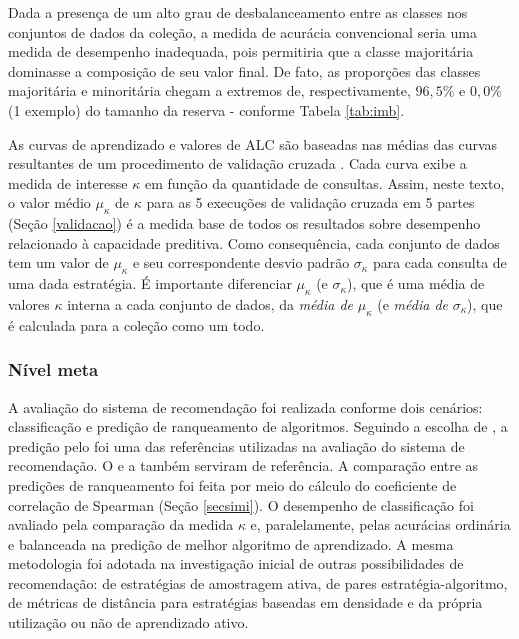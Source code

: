 Dada a presença de um alto grau de desbalanceamento entre as classes nos conjuntos de dados da coleção, a medida de acurácia convencional seria uma medida de desempenho inadequada, pois permitiria que a classe majoritária dominasse a composição de seu valor final.
De fato, as proporções das classes majoritária e minoritária chegam a extremos de, respectivamente, $96,5\%$ e $0,0\%$ (1 exemplo) do tamanho da reserva - conforme Tabela \ref{tab:imb}.

As curvas de aprendizado e valores de ALC são baseadas nas médias das curvas resultantes de um procedimento de validação cruzada \cite{settles2010active}.
Cada curva exibe a medida de interesse $\kappa$ em função da quantidade de consultas.
Assim, neste texto,  o valor médio $\mu_{\kappa}$ de $\kappa$ para as 5 execuções de validação cruzada em 5 partes (Seção \ref{validacao}) é a medida base de todos os resultados sobre desempenho relacionado à capacidade preditiva.
Como consequência, cada conjunto de dados tem um valor de $\mu_{\kappa}$ e seu correspondente desvio padrão $\sigma_{\kappa}$ para cada consulta de uma dada estratégia.
É importante diferenciar $\mu_{\kappa}$ (e $\sigma_{\kappa}$), que é uma média de valores $\kappa$ interna a cada conjunto de dados, da \textit{média de} $\mu_{\kappa}$ (e \textit{média de} $\sigma_{\kappa}$), que é calculada para a coleção como um todo.

\subsubsection{Nível meta}\label{avmeta}
A avaliação do sistema de recomendação foi realizada conforme dois cenários:
classificação 
e predição de ranqueamento de algoritmos.
Seguindo a escolha de , a predição pelo  foi uma das referências utilizadas na avaliação do sistema de recomendação.
O  e a  também serviram de referência.
A comparação entre as predições de ranqueamento foi feita por meio do cálculo do coeficiente de correlação de Spearman (Seção \ref{secsimi}).
O desempenho de classificação foi avaliado pela comparação da medida $\kappa$ e, paralelamente, pelas acurácias ordinária e balanceada na predição de melhor algoritmo de aprendizado.
A mesma metodologia foi adotada na investigação inicial de outras possibilidades de recomendação: de estratégias de amostragem ativa, de pares estratégia-algoritmo, de métricas de distância para estratégias baseadas em densidade e da própria utilização ou não de aprendizado ativo.

